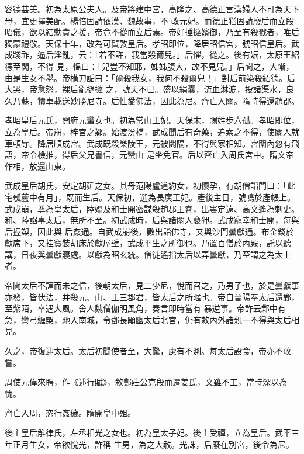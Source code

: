 \begin{pinyinscope}
 容德甚美。初為太原公夫人。及帝將建中宮，高隆之、高德正言漢婦人不可為天下母，宜更擇美配。楊愔固請依漢、魏故事，不
 改元妃。而德正猶固請廢后而立段昭儀，欲以結勳貴之援，帝竟不從而立后焉。帝好捶撻嬪御，乃至有殺戮者，唯后獨蒙禮敬。天保十年，改為可賀敦皇后。孝昭即位，降居昭信宮，號昭信皇后。武成踐祚，逼后淫亂，云：「若不許，我當殺爾兒。」后懼，從之。後有娠，太原王紹德至閣，不得
 見，慍曰：「兒豈不知耶，姊姊腹大，故不見兒。」后聞之，大慚，由是生女不舉。帝橫刀詬曰：「爾殺我女，我何不殺爾兒！」對后前築殺紹德。后大哭，帝愈怒，裸后亂撾撻
 之，號天不已。盛以絹囊，流血淋漉，投諸渠水，良久乃蘇，犢車載送妙勝尼寺。后性愛佛法，因此為尼。齊亡入關。隋時得還趙郡。



 孝昭皇后元氏，開府元蠻女也。初為常山王妃。天保末，賜姓步六孤。孝昭即位，立為皇后。帝崩，梓宮之鄴。始渡汾橋，武成聞后有奇藥，追索之不得，使閹人就車頓辱。降居順成宮。武成既殺樂陵王，元被閟隔，不得與家相知。宮闈內忽有飛語，帝令檢推，得后父兄書信，元蠻由
 是坐免官。后以齊亡入周氏宮中。隋文帝作相，放還山東。



 武成皇后胡氏，安定胡延之女。其母范陽盧道約女，初懷孕，有胡僧詣門曰：「此宅瓠蘆中有月」，既而生后。天保初，選為長廣王妃。產後主日，號鳴於產帳上。武成崩，尊為皇太后，陸媼及和士開密謀殺趙郡王睿，出婁定遠、高文遙為刺史。和、陸諂事太后，無所不至。初武成時，后與諸閹人褻狎。武成寵幸和士開，每與后握槊，因此與
 后姦通。自武成崩後，數出詣佛寺，又與沙門曇獻通。布金錢於獻席下，又挂寶裝胡床於獻屋壁，武成平生之所御也。乃置百僧於內殿，託以聽講，日夜與曇獻寢處。以獻為昭玄統。僧徒遙指太后以弄曇獻，乃至謂之為太上者。



 帝聞太后不謹而未之信，後朝太后，見二少尼，悅而召之，乃男子也，於是曇獻事亦發，皆伏法，并殺元、山、王三郡君，皆太后之所暱也。帝自晉陽奉太后還鄴，至紫陌，卒遇大風。舍人魏僧伽明風角，奏言即時當有
 暴逆事。帝詐云鄴中有急，彎弓緾槊，馳入南城，令鄧長顒幽太后北宮，仍有敕內外諸親一不得與太后相見。



 久之，帝復迎太后。太后初聞使者至，大驚，慮有不測。每太后設食，帝亦不敢嘗。



 周使元偉來聘，作《述行賦》，敘鄭莊公克段而遷姜氏，文雖不工，當時深以為愧。



 齊亡入周，恣行姦穢。隋開皇中殂。



 後主皇后斛律氏，左丞相光之女也。初為皇太子妃。後主受禪，立為皇后。武平三年正月生女，帝欲悅光，詐稱
 生男，為之大赦。光誅，后廢在別宮，後令為尼。




\end{pinyinscope}
